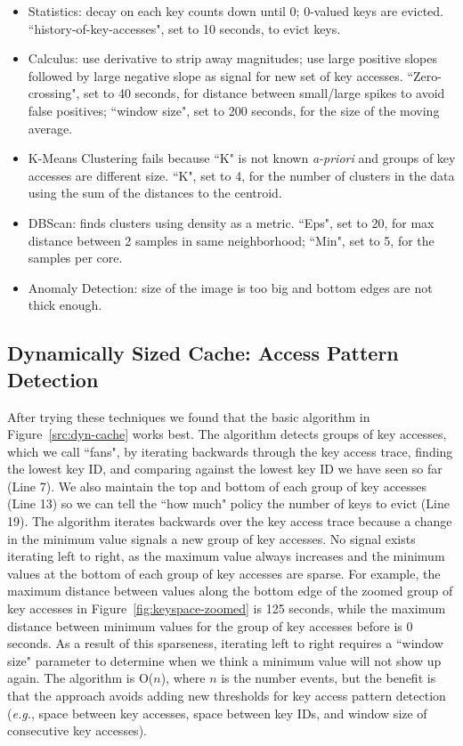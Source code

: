 \begin{itemize}

  \item Statistics: decay on each key counts down until 0; 0-valued keys are
evicted.  ``history-of-key-accesses", set to 10 seconds, to evict keys.

  \item Calculus: use derivative to strip away magnitudes; use large positive
slopes followed by large negative slope as signal for new set of key accesses.
``Zero-crossing", set to 40 seconds, for distance between small/large spikes to
avoid false positives; ``window size", set to 200 seconds, for the size of the
moving average.

  \item K-Means Clustering fails because ``K" is not known {\it a-priori} and
groups of key accesses are different size. ``K", set to 4, for the number of clusters in the data
using the sum of the distances to the centroid.

  \item DBScan: finds clusters using density as a metric. ``Eps", set to 20, for
max distance between 2 samples in same neighborhood; ``Min", set to 5, for the
samples per core.

  \item Anomaly Detection: size of the image is too big and bottom edges are
not thick enough.

\end{itemize}

\subsection{Dynamically Sized Cache: Access Pattern Detection}
\label{sec:regime-detection}

After trying these techniques we found that the basic algorithm in
Figure~\ref{src:dyn-cache} works best. The algorithm detects groups of key
accesses, which we call ``fans", by iterating backwards through the key access
trace, finding the lowest key ID, and comparing against the lowest key ID we
have seen so far (Line 7). We also maintain the top and bottom of each group of
key accesses (Line 13) so we can tell the ``how much" policy the number of keys
to evict (Line 19).  The algorithm iterates backwards over the key access trace
because a change in the minimum value signals a new group of key accesses. No
signal exists iterating left to right, as the maximum value always increases
and the minimum values at the bottom of each group of key accesses are sparse.
For example, the maximum distance between values along the bottom edge of the
zoomed group of key accesses in Figure~\ref{fig:keyspace-zoomed} is 125
seconds, while the maximum distance between minimum values for the group of key
accesses before is 0 seconds. As a result of this sparseness, iterating left to
right requires a ``window size" parameter to determine when we think a minimum
value will not show up again.  The algorithm is O(\(n\)), where \(n\) is the
number events, but the benefit is that the approach avoids adding new
thresholds for key access pattern detection ({\it e.g.}, space between key
accesses, space between key IDs, and window size of consecutive key accesses).

